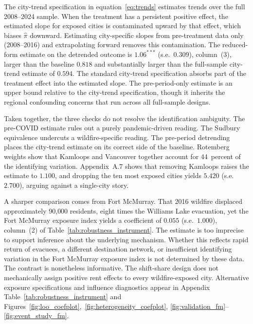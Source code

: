 \documentclass[12pt]{article}
\begin{document}
The city-trend specification in equation~\eqref{eq:trends} estimates trends over the
full 2008--2024 sample. When the treatment has a persistent positive effect, the
estimated slope for exposed cities is contaminated upward by that effect, which
biases $\hat{\pi}$ downward. Estimating city-specific slopes from pre-treatment
data only (2008--2016) and extrapolating forward removes this contamination.
The reduced-form estimate on the detrended outcome is $1.06^{***}$ (s.e.\ $0.309$),
column~(3), larger than the baseline $0.818$ and substantially larger than the
full-sample city-trend estimate of $0.594$. The standard city-trend specification
absorbs part of the treatment effect into the estimated slope. The pre-period-only
estimate is an upper bound relative to the city-trend specification, though it
inherits the regional confounding concerns that run across all full-sample designs.

Taken together, the three checks do not resolve the identification ambiguity. The
pre-COVID estimate rules out a purely pandemic-driven reading. The Sudbury
equivalence undercuts a wildfire-specific reading. The pre-period detrending places
the city-trend estimate on its correct side of the baseline. Rotemberg weights show
that Kamloops and Vancouver together account for 44~percent of the identifying
variation. Appendix~A.7 shows that removing Kamloops raises the estimate to $1.100$,
and dropping the ten most exposed cities yields $5.420$ (s.e.\ $2.700$),
arguing against a single-city story.

A sharper comparison comes from Fort McMurray. That 2016 wildfire displaced
approximately 90{,}000 residents, eight times the Williams Lake evacuation, yet
the Fort McMurray exposure index yields a coefficient of $0.055$ (s.e.\ $1.000$),
column~(2) of Table~\ref{tab:robustness_instrument}. The estimate is too imprecise
to support inference about the underlying mechanism. Whether this reflects rapid
return of evacuees, a different destination network, or insufficient identifying
variation in the Fort McMurray exposure index is not determined by these data.
The contrast is nonetheless informative. The shift-share design does not
mechanically assign positive rent effects to every wildfire-exposed city. Alternative exposure
specifications and influence diagnostics appear in Appendix
Table~\ref{tab:robustness_instrument} and
Figures~\ref{fig:loo_coefplot},~\ref{fig:heterogeneity_coefplot},
\ref{fig:validation_fm}--\ref{fig:event_study_fm}.

\clearpage
\end{document}
